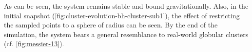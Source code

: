 As can be seen, the system remains stable and bound gravitationally.
Also, in the initial snapshot (\autoref{fig:cluster-evolution-bh-cluster-sub1}), the effect of restricting the sampled points to a sphere of radius can be seen.
By the end of the simulation, the system bears a general resemblance to real-world globular clusters (cf. \autoref{fig:messier-13}).
